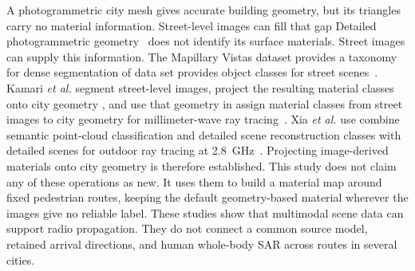 \documentclass{IEEEoj} %
\providecommand{\DIFadd}[1]{{\protect\color{blue} \sf #1}} %
\providecommand{\DIFdel}[1]{{\protect\color{red} \scriptsize #1}} %
\providecommand{\DIFaddbegin}{} %
\providecommand{\DIFaddend}{} %
\providecommand{\DIFdelbegin}{} %
\providecommand{\DIFdelend}{} %
\begin{document}
\DIFdelbegin \DIFdel{A photogrammetric city mesh gives accurate building geometry, but its
triangles
carry no material information. Street-level images can fill that gap}\DIFdelend \DIFaddbegin \DIFadd{Detailed photogrammetric geometry~\cite{google3d,blosm} does not identify its
surface materials. Street images can supply this information}\DIFaddend . The Mapillary
Vistas \DIFdelbegin \DIFdel{dataset provides a taxonomy for dense segmentation of }\DIFdelend \DIFaddbegin \DIFadd{data set provides object classes for }\DIFaddend street scenes~\cite{vistas}.
Kamari \emph{et al.} \DIFdelbegin \DIFdel{segment street-level images, project
the resulting material classes onto city geometry
, and use that geometry in
}\DIFdelend \DIFaddbegin \DIFadd{assign material classes from street images to city geometry
for }\DIFaddend millimeter-wave ray tracing~\cite{mmsv}. Xia \emph{et al.} \DIFdelbegin \DIFdel{use }\DIFdelend \DIFaddbegin \DIFadd{combine }\DIFaddend semantic
point-cloud \DIFdelbegin \DIFdel{classification and detailed scene reconstruction }\DIFdelend \DIFaddbegin \DIFadd{classes with detailed scenes }\DIFaddend for outdoor ray tracing at
2.8~GHz~\cite{xia2024}. \DIFdelbegin \DIFdel{Projecting image-derived materials onto
city geometry is therefore established. This study does not claim any of these
operations as new. It uses them to build a material map around fixed pedestrian
routes, keeping the default geometry-based material wherever the images give no
reliable label.
}\DIFdelend \DIFaddbegin \DIFadd{These studies show that multimodal scene data can
support radio propagation. They do not connect a common source model, retained
arrival directions, and human whole-body SAR across routes in several cities.
}\DIFaddend
\end{document}
